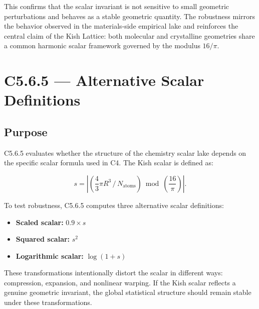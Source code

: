 \documentclass[11pt, letterpaper, openany]{book}
\begin{document}
This confirms that the scalar invariant is not sensitive to small geometric
perturbations and behaves as a stable geometric quantity. The robustness mirrors
the behavior observed in the materials‑side empirical lake and reinforces the
central claim of the Kish Lattice: both molecular and crystalline geometries
share a common harmonic scalar framework governed by the modulus \(16/\pi\).


\section{C5.6.5 — Alternative Scalar Definitions}

\subsection*{Purpose}
C5.6.5 evaluates whether the structure of the chemistry scalar lake depends on
the specific scalar formula used in C4. The Kish scalar is defined as:



\[
s = \left| \left( \frac{4}{3}\pi R^3 \,/\, N_{\text{atoms}} \right)
      \bmod \left( \frac{16}{\pi} \right) \right|.
\]



To test robustness, C5.6.5 computes three alternative scalar definitions:

\begin{itemize}
    \item \textbf{Scaled scalar:} \(0.9 \times s\)
    \item \textbf{Squared scalar:} \(s^2\)
    \item \textbf{Logarithmic scalar:} \(\log(1 + s)\)
\end{itemize}

These transformations intentionally distort the scalar in different ways:
compression, expansion, and nonlinear warping. If the Kish scalar reflects a
genuine geometric invariant, the global statistical structure should remain
stable under these transformations.
\end{document}
